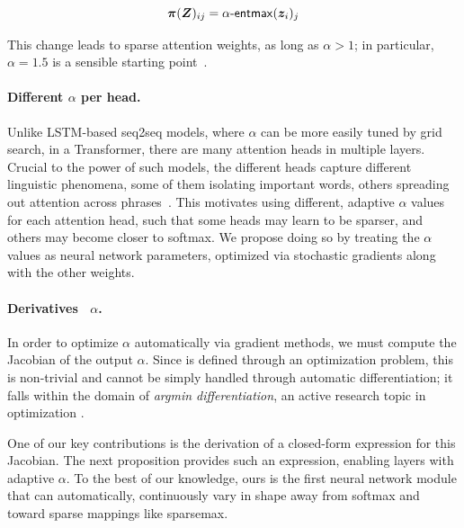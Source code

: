 \begin{equation}
    \bm{\pi}(\bm{Z})_{ij} = \mathop{\mathsf{\alpha}\textnormal{-}\mathsf{entmax}}(\bm{z}_i)_j
\end{equation}

This change leads to sparse attention weights, as long as
$\alpha>1$; in particular, $\alpha=1.5$ is a sensible starting
point~\citep{entmax}.

\paragraph*{Different {\boldmath $\alpha$} per head.}
Unlike LSTM-based seq2seq models, where $\alpha$ can be more easily
tuned by grid search, in a Transformer, there are many attention
heads in multiple layers. Crucial to the power of such models, the
different heads capture different linguistic phenomena, some of them
isolating important words, others spreading out attention across
phrases~\citep[Figure~5]{vaswani2017attention}. This motivates using
different, adaptive $\alpha$ values for each attention head, such
that some heads may learn to be sparser, and others may become closer
to softmax. We propose doing so by treating the $\alpha$ values as
neural network parameters, optimized via stochastic gradients along
with the other weights.

\paragraph*{Derivatives \wrt~{\boldmath $\alpha$}.}
In order to optimize $\alpha$ automatically via gradient methods, we
must compute the Jacobian of the \entmaxtext output \wrt $\alpha$.
Since \entmaxtext is defined through an optimization problem, this is
non-trivial and cannot be simply handled through automatic
differentiation; it falls within the domain of \emph{argmin
    differentiation}, an active research topic in optimization
\citep{gould,optnet}.

One of our key contributions is the derivation of a closed-form
expression for this Jacobian. The next proposition provides
such an expression, enabling \entmaxtext layers with
adaptive $\alpha$. To the best of our knowledge, ours is the first
neural network module that can automatically, continuously vary in
shape away from softmax and toward sparse mappings like sparsemax.

